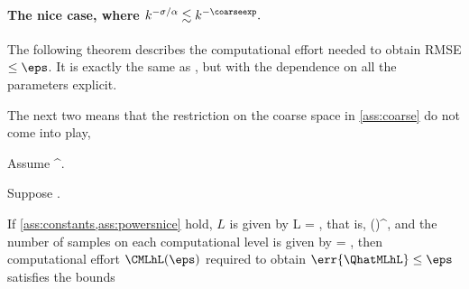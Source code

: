 
 \paragraph{The nice case, where $k^{-\sigma/\alpha} \lesssim k^{-\coarseexp}.$}
 The following theorem describes the computational effort needed to obtain RMSE $\leq \eps$. It is exactly the same as \cite[Theorem 1]{ClGiScTe:11}, but with the dependence on all the parameters explicit.%

  The next two  means that the restriction on the coarse space in \cref{ass:coarse} do not come into play,

 \label{ass:constants}
 Assume
 \beqs
\eps \leq {} \co \Ccoarse^{\alpha}.
 \eeqs
 \eas

 \bas\label{ass:powersnice}
 Suppose
 \beqs
\frac{\sigma}{\alpha} \geq \coarseexp.
 \eeqs
 \eas
 
 \label{thm:mlmccomp}
If \cref{ass:constants,ass:powersnice} hold, $L$ is given by
\beq\label{eq:Lcond}
L = ,
\eeq
that is,
\beqs
\hL \leq \mleft(\mright)^{\alpha},
\eeqs
and the number of samples on each computational level is given by
\beqs
\Nl = ,
\eeqs
then computational effort $\CMLhL(\eps)$ required to obtain $\err{\QhatMLhL} \leq \eps$ satisfies the bounds
 

